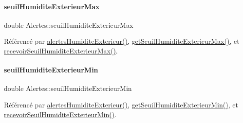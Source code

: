 \mbox{\label{class_alertes_afa54793d1f47a97894faf91e76fb2a04}} 
\paragraph{\texorpdfstring{seuil\+Humidite\+Exterieur\+Max}{seuilHumiditeExterieurMax}}
{\footnotesize\ttfamily double Alertes\+::seuil\+Humidite\+Exterieur\+Max\hspace{0.3cm}{\ttfamily [private]}}



Référencé par \hyperlink{class_alertes_a8606946eaa04dfd29bb7951b2b850a04}{alertes\+Humidite\+Exterieur()}, \hyperlink{class_alertes_ad2c8daf5668f5d122efb9b84f7ea86de}{get\+Seuil\+Humidite\+Exterieur\+Max()}, et \hyperlink{class_alertes_a8c8500d99314034be3c01a871f209fb8}{recevoir\+Seuil\+Humidite\+Exterieur\+Max()}.

\mbox{\label{class_alertes_a18afbc02513a6e4fa8baa665092719c9}} 
\paragraph{\texorpdfstring{seuil\+Humidite\+Exterieur\+Min}{seuilHumiditeExterieurMin}}
{\footnotesize\ttfamily double Alertes\+::seuil\+Humidite\+Exterieur\+Min\hspace{0.3cm}{\ttfamily [private]}}



Référencé par \hyperlink{class_alertes_a8606946eaa04dfd29bb7951b2b850a04}{alertes\+Humidite\+Exterieur()}, \hyperlink{class_alertes_a68e467e042b615f56347a0953d6e64f1}{get\+Seuil\+Humidite\+Exterieur\+Min()}, et \hyperlink{class_alertes_a021d167be6c98d9b0718bb9c7209b47e}{recevoir\+Seuil\+Humidite\+Exterieur\+Min()}.

\mbox{\label{class_alertes_a795cd3721854335f6c91e6009b324c37}} 
